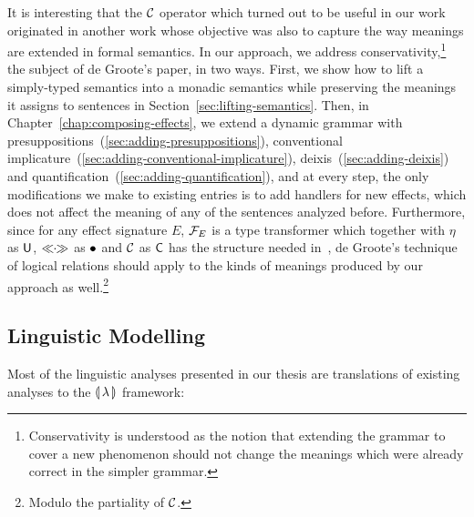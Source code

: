 It is interesting that the $\mathcal{C}$ operator which turned out to be useful in
our work originated in another work whose objective was also to capture the
way meanings are extended in formal semantics. In our approach, we address
conservativity,\footnote{Conservativity is understood as the notion that
  extending the grammar to cover a new phenomenon should not change the
  meanings which were already correct in the simpler grammar.} the subject
of de Groote's paper, in two ways. First, we show how to lift a
simply-typed semantics into a monadic semantics while preserving the
meanings it assigns to sentences in
Section~\ref{sec:lifting-semantics}. Then, in
Chapter~\ref{chap:composing-effects}, we extend a dynamic grammar with
presuppositions~(\ref{sec:adding-presuppositions}), conventional
implicature~(\ref{sec:adding-conventional-implicature}),
deixis~(\ref{sec:adding-deixis}) and
quantification~(\ref{sec:adding-quantification}), and at every step, the
only modifications we make to existing entries is to add handlers for new
effects, which does not affect the meaning of any of the sentences analyzed
before. Furthermore, since for any effect signature $E$, $\mathcal{F}_E$ is a type
transformer which together with $\eta$ as $\mathsf{U}$, $\mathbin{\ll\!\!\cdot\!\!\gg}$ as $\mathbin{\bullet}$ and
$\mathcal{C}$ as $\mathsf{C}$ has the structure needed
in~\cite{degroote2015conservativity}, de Groote's technique of logical
relations should apply to the kinds of meanings produced by our approach as
well.\footnote{Modulo the partiality of $\mathcal{C}$.}


\subsection{Linguistic Modelling}
\label{ssec:comparison-linguistic}

Most of the linguistic analyses presented in our thesis are translations of
existing analyses to the ${\llparenthesis \, \lambda \, \rrparenthesis}$ framework:


